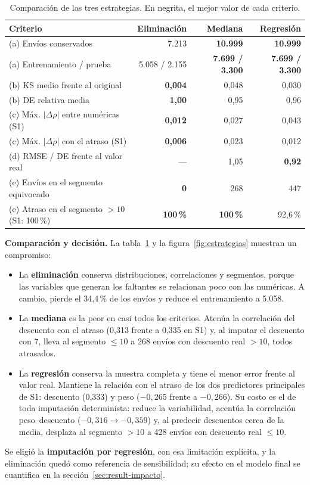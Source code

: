 \documentclass[11pt,a4paper]{article}
\begin{document}
\begin{table}[!htb]\centering\footnotesize\setlength{\tabcolsep}{4pt}
\caption{Comparación de las tres estrategias. En negrita, el mejor valor de cada criterio.}\label{tab:estrategias}
\begin{tabular}{@{}lrrr@{}}\toprule
Criterio & Eliminación & Mediana & Regresión\\\midrule
(a) Envíos conservados & 7.213 & \textbf{10.999} & \textbf{10.999}\\
(a) Entrenamiento / prueba & 5.058 / 2.155 & \textbf{7.699 / 3.300} & \textbf{7.699 / 3.300}\\
(b) KS medio frente al original & \textbf{0,004} & 0,048 & 0,030\\
(b) DE relativa media & \textbf{1,00} & 0,95 & 0,96\\
(c) Máx. $|\Delta\rho|$ entre numéricas (S1) & \textbf{0,012} & 0,027 & 0,043\\
(c) Máx. $|\Delta\rho|$ con el atraso (S1) & \textbf{0,006} & 0,023 & 0,012\\
(d) RMSE / DE frente al valor real & --- & 1,05 & \textbf{0,92}\\
(e) Envíos en el segmento equivocado & \textbf{0} & 268 & 447\\
(e) Atraso en el segmento $> 10$ (S1: 100\,\%) & \textbf{100\,\%} & \textbf{100\,\%} & 92,6\,\%\\
\bottomrule\end{tabular}
\end{table}

\textbf{Comparación y decisión.} La tabla~\ref{tab:estrategias} y la figura~\ref{fig:estrategias} muestran un compromiso:
\begin{itemize}[leftmargin=*,itemsep=0pt,topsep=1pt]
\item La \textbf{eliminación} conserva distribuciones, correlaciones y segmentos, porque las variables que generan los faltantes se relacionan poco con las numéricas. A cambio, pierde el 34,4\,\% de los envíos y reduce el entrenamiento a 5.058.
\item La \textbf{mediana} es la peor en casi todos los criterios. Atenúa la correlación del descuento con el atraso (0,313 frente a 0,335 en S1) y, al imputar el descuento con 7, lleva al segmento $\le 10$ a 268 envíos con descuento real $> 10$, todos atrasados.
\item La \textbf{regresión} conserva la muestra completa y tiene el menor error frente al valor real. Mantiene la relación con el atraso de los dos predictores principales de S1: descuento (0,333) y peso ($-0{,}265$ frente a $-0{,}266$). Su costo es el de toda imputación determinista: reduce la variabilidad, acentúa la correlación peso--descuento ($-0{,}316 \to -0{,}359$) y, al predecir descuentos cerca de la media, desplaza al segmento $> 10$ a 428 envíos con descuento real $\le 10$.
\end{itemize}
Se eligió la \textbf{imputación por regresión}, con esa limitación explícita, y la eliminación quedó como referencia de sensibilidad; su efecto en el modelo final se cuantifica en la sección~\ref{sec:result-impacto}.
\end{document}
